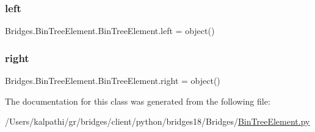 \subsubsection{\texorpdfstring{left}{left}}
{\footnotesize\ttfamily Bridges.\+Bin\+Tree\+Element.\+Bin\+Tree\+Element.\+left = object()\hspace{0.3cm}{\ttfamily [static]}}

\mbox{\label{class_bridges_1_1_bin_tree_element_1_1_bin_tree_element_a5130987f56eff4edcc8c8ef323f8cd3d}} 
\subsubsection{\texorpdfstring{right}{right}}
{\footnotesize\ttfamily Bridges.\+Bin\+Tree\+Element.\+Bin\+Tree\+Element.\+right = object()\hspace{0.3cm}{\ttfamily [static]}}



The documentation for this class was generated from the following file\+:\begin{DoxyCompactItemize}
\item 
/\+Users/kalpathi/gr/bridges/client/python/bridges18/\+Bridges/\mbox{\hyperlink{_bin_tree_element_8py}{Bin\+Tree\+Element.\+py}}\end{DoxyCompactItemize}

